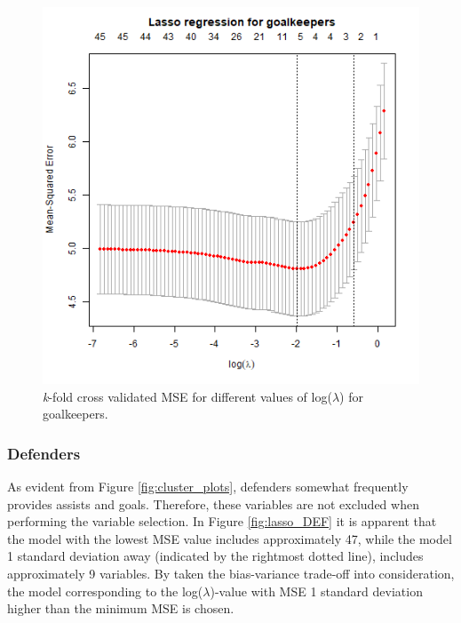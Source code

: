 \begin{figure}[H]
    \centering
    \includegraphics[scale=0.55]{fig/chapter_6/lasso_GLK.png}
    \caption{\textit{k}-fold cross validated MSE for different values of log($\lambda$) for goalkeepers.}
\label{fig:lasso_GLK}    
\end{figure}

\subsubsection{Defenders}
As evident from Figure \ref{fig:cluster_plots}, defenders somewhat frequently provides assists and goals. Therefore, these variables are not excluded when performing the variable selection. In Figure \ref{fig:lasso_DEF} it is apparent that the model with the lowest MSE value includes approximately 47, while the model 1 standard deviation away (indicated by the rightmost dotted line), includes approximately 9 variables. By taken the bias-variance trade-off into consideration, the model corresponding to the log($\lambda$)-value with MSE 1 standard deviation higher than the minimum MSE is chosen.

